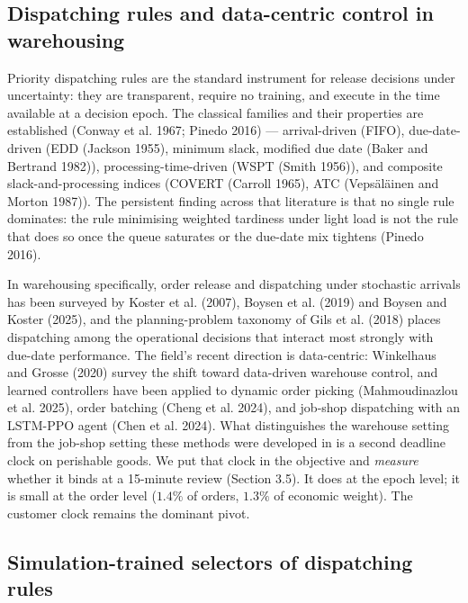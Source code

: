 \documentclass[review,3p,times]{elsarticle}
\theoremstyle{definition}
\begin{document}
\subsection{Dispatching rules and data-centric control in
warehousing}\label{dispatching-rules-and-data-centric-control-in-warehousing}

Priority dispatching rules are the standard instrument for release
decisions under uncertainty: they are transparent, require no training,
and execute in the time available at a decision epoch. The classical
families and their properties are established (Conway et al. 1967;
Pinedo 2016) --- arrival-driven (FIFO), due-date-driven (EDD (Jackson
1955), minimum slack, modified due date (Baker and Bertrand 1982)),
processing-time-driven (WSPT (Smith 1956)), and composite
slack-and-processing indices (COVERT (Carroll 1965), ATC (Vepsäläinen
and Morton 1987)). The persistent finding across that literature is that
no single rule dominates: the rule minimising weighted tardiness under
light load is not the rule that does so once the queue saturates or the
due-date mix tightens (Pinedo 2016).

In warehousing specifically, order release and dispatching under
stochastic arrivals has been surveyed by Koster et al. (2007), Boysen et
al. (2019) and Boysen and Koster (2025), and the planning-problem
taxonomy of Gils et al. (2018) places dispatching among the operational
decisions that interact most strongly with due-date performance. The
field's recent direction is data-centric: Winkelhaus and Grosse (2020)
survey the shift toward data-driven warehouse control, and learned
controllers have been applied to dynamic order picking (Mahmoudinazlou
et al. 2025), order batching (Cheng et al. 2024), and job-shop
dispatching with an LSTM-PPO agent (Chen et al. 2024). What
distinguishes the warehouse setting from the job-shop setting these
methods were developed in is a second deadline clock on perishable
goods. We put that clock in the objective and \emph{measure} whether it
binds at a 15-minute review (Section 3.5). It does at the epoch level;
it is small at the order level (\(1.4\%\) of orders, \(1.3\%\) of
economic weight). The customer clock remains the dominant pivot.

\subsection{Simulation-trained selectors of dispatching
rules}\label{simulation-trained-selectors-of-dispatching-rules}
\end{document}
